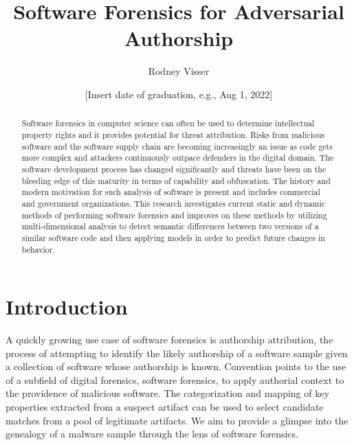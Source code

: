 \documentclass[12pt]{report}
\title{Software Forensics for Adversarial Authorship}
\author{Rodney Visser}
\date{[Insert date of graduation, e.g., Aug 1, 2022]} %
\begin{document}
\begin{romanpages}      %
\TitlePage 

\begin{abstract} 
Software forensics in computer science can often be used to determine intellectual property rights and it provides potential for threat attribution.  Risks from malicious software and the software supply chain are becoming increasingly an issue as code gets more complex and attackers continuously outpace defenders in the digital domain.  The software development process has changed significantly and threats have been on the bleeding edge of this maturity in terms of capability and obfuscation. The history and modern motivation for such analysis of software is present and includes commercial and government organizations.  This research investigates current static and dynamic methods of performing software forensics and improves on these methods by utilizing multi-dimensional analysis to detect semantic differences between two versions of a similar software code and then applying models in order to predict future changes in behavior.
\end{abstract}


\tableofcontents
\listoffigures

\printnomenclature[0.5in] %
\end{romanpages}        %


\normalem       %
\chapter{Introduction}  
\label{chap:one}

A quickly growing use case of software forensics is authorship attribution, the process of attempting to identify the likely authorship of a software sample given a collection of software whose authorship is known.  Convention points to the use of a subfield of digital forensics, software forensics,  to apply authorial context to the providence of malicious software.  The categorization and mapping of key properties extracted from a suspect artifact can be used to select candidate matches from a pool of legitimate artifacts.  We aim to provide a glimpse into the genealogy of a malware sample through the lens of software forensics.
\end{document}

